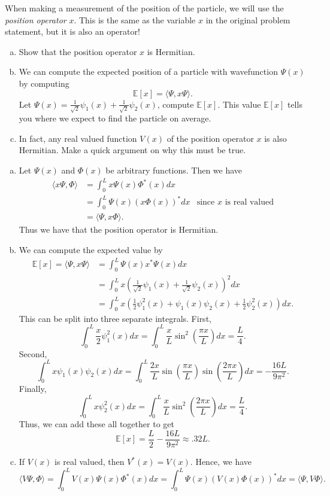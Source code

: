\documentclass[12pt]{article} %
\newcommand{\innprod}[2]{\langle #1, #2 \rangle}
\begin{document}
\newpage
\begin{problem}
  When making a measurement of the position of the particle, we will use the \emph{position operator} $x$.  This is the same as the variable $x$ in the original problem statement, but it is also an operator!
   \begin{enumerate}[(a)]
   		\item Show that the position operator $x$ is Hermitian.
   		\item We can compute the expected position of a particle with wavefunction $\Psi(x)$ by computing
   		\[
   		\mathbb{E}[x]=\innprod{\Psi}{x\Psi}.
   		\]
   		Let $\Psi(x) = \frac{1}{\sqrt{2}} \psi_1(x) + \frac{1}{\sqrt{2}} \psi_2(x)$, compute $\mathbb{E}[x]$. This value $\mathbb{E}[x]$ tells you where we expect to find the particle on average.
    	\item In fact, any real valued function $V(x)$ of the position operator $x$ is also Hermitian. Make a quick argument on why this must be true.
   	\end{enumerate}
\end{problem}
\begin{solution}
	\begin{enumerate}[(a)]
		\item Let $\Psi(x)$ and $\Phi(x)$ be arbitrary functions.  Then we have
		\begin{align*}
			\innprod{x\Psi}{\Phi} &= \int_0^L x \Psi(x)\Phi^*(x)dx\\
			&= \int_0^L \Psi(x) \left(x \Phi(x)\right)^*dx &\textrm{since $x$ is real valued}\\
			&= \innprod{\Psi}{x\Phi}.
		\end{align*}
		Thus we have that the position operator is Hermitian.
		\item We can compute the expected value by
		\begin{align*}
			\mathbb{E}[x] = \innprod{\Psi}{x\Psi} &= \int_0^L \Psi(x) x^* \Psi(x)dx\\
			&= \int_0^L x\left(\frac{1}{\sqrt{2}}\psi_1(x)+\frac{1}{\sqrt{2}} \psi_2(x)\right)^2dx\\
			&= \int_0^L x \left(\frac{1}{2} \psi_1^2(x) + \psi_1(x)\psi_2(x) + \frac{1}{2} \psi_2^2(x)\right)dx.
		\end{align*}
		This can be split into three separate integrals. First,
		\[
		\int_0^L \frac{x}{2} \psi_1^2(x)dx = \int_0^L \frac{x}{L} \sin^2\left(\frac{\pi x}{L}\right)dx = \frac{L}{4}.
		\]
		Second,
		\[
		\int_0^L x \psi_1(x)\psi_2(x)dx = \int_0^L \frac{2x}{L} \sin\left(\frac{\pi x}{L}\right)\sin\left(\frac{2\pi x}{L}\right)dx = -\frac{16L}{9\pi^2}.
		\]
		Finally,
		\[
		\int_0^L x \psi_2^2(x)dx = \int_0^L \frac{x}{L} \sin^2\left(\frac{2\pi x}{L}\right)dx = \frac{L}{4}.
		\]
		Thus, we can add these all together to get
		\[
		\boxed{\mathbb{E}[x] = \frac{L}{2}-\frac{16L}{9\pi^2}\approx .32L}.
		\]
        \item If $V(x)$ is real valued, then $V^*(x)=V(x)$.  Hence, we have
	\[
	\innprod{V\Psi}{\Phi} = \int_0^L V(x)\Psi(x)\Phi^*(x)dx = \int_0^L \Psi(x)\left(V(x)\Phi(x)\right)^*dx = \innprod{\Psi}{V\Phi}.
	\]
	\end{enumerate}
\end{solution}
\end{document}
